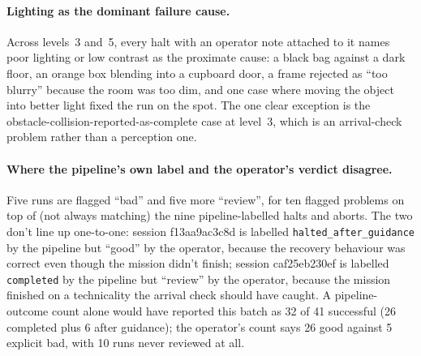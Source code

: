 \paragraph{Lighting as the dominant failure cause.} Across levels~3 and~5, every halt with an operator note
attached to it names poor lighting or low contrast as the proximate cause: a black bag against a dark floor, an
orange box blending into a cupboard door, a frame rejected as ``too blurry'' because the room was too dim, and one
case where moving the object into better light fixed the run on the spot. The one clear exception is the
obstacle-collision-reported-as-complete case at level~3, which is an arrival-check problem rather than a perception
one. 

\paragraph{Where the pipeline's own label and the operator's verdict disagree.} Five runs are flagged ``bad'' and
five more ``review'', for ten flagged problems on top of (not always matching) the nine pipeline-labelled halts and
aborts. The two don't line up one-to-one: session f13aa9ac3c8d is labelled \texttt{halted\_after\_guidance} by the
pipeline but ``good'' by the operator, because the recovery behaviour was correct even though the mission didn't
finish; session caf25eb230ef is labelled \texttt{completed} by the pipeline but ``review'' by the operator, because
the mission finished on a technicality the arrival check should have caught. A pipeline-outcome count alone would
have reported this batch as 32 of 41 successful (26 completed plus 6 after guidance); the operator's count says 26
good against 5 explicit bad, with 10 runs never reviewed at all. 

